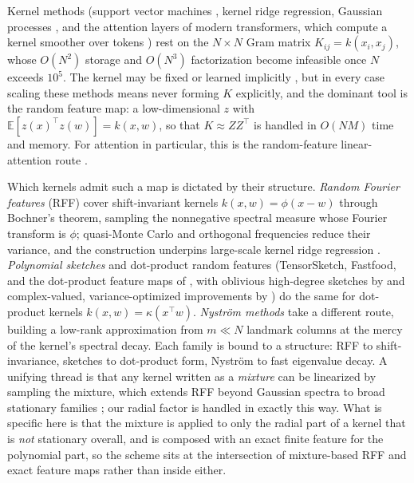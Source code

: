 \documentclass{article}
\begin{document}
Kernel methods (support vector machines \citep{cortes1995support}, kernel ridge regression, Gaussian processes \citep{rasmussen2006gaussian}, and the attention layers of modern transformers, which compute a kernel smoother over tokens \citep{tsai2019transformer}) rest on the $N\times N$ Gram matrix $K_{ij}=k(x_i,x_j)$, whose $O(N^2)$ storage and $O(N^3)$ factorization become infeasible once $N$ exceeds $10^5$. The kernel may be fixed or learned implicitly \citep{li2019implicit}, but in every case scaling these methods means never forming $K$ explicitly, and the dominant tool is the random feature map: a low-dimensional $z$ with $\mathbb{E}[z(x)^\top z(w)]=k(x,w)$, so that $K\approx ZZ^\top$ is handled in $O(NM)$ time and memory. For attention in particular, this is the random-feature linear-attention route \citep{katharopoulos2020transformers,choromanski2021rethinking}.

Which kernels admit such a map is dictated by their structure. \emph{Random Fourier features} (RFF) \citep{rahimi2007random} cover shift-invariant kernels $k(x,w)=\phi(x-w)$ through Bochner's theorem, sampling the nonnegative spectral measure whose Fourier transform is $\phi$; quasi-Monte Carlo \citep{avron2016quasi} and orthogonal frequencies \citep{yu2016orthogonal} reduce their variance, and the construction underpins large-scale kernel ridge regression \citep{avron2017random}. \emph{Polynomial sketches} and dot-product random features (TensorSketch, Fastfood, and the dot-product feature maps of \citealp{pham2013fast,le2013fastfood,kar2012random}, with oblivious high-degree sketches by \citealp{ahle2020oblivious} and complex-valued, variance-optimized improvements by \citealp{wacker2024improved}) do the same for dot-product kernels $k(x,w)=\kappa(x^\top w)$. \emph{Nystr\"om methods} \citep{williams2000using,musco2017recursive} take a different route, building a low-rank approximation from $m\ll N$ landmark columns at the mercy of the kernel's spectral decay. Each family is bound to a structure: RFF to shift-invariance, sketches to dot-product form, Nystr\"om to fast eigenvalue decay. A unifying thread is that any kernel written as a \emph{mixture} can be linearized by sampling the mixture, which extends RFF beyond Gaussian spectra to broad stationary families \citep{wilson2013gpkernels}; our radial factor is handled in exactly this way. What is specific here is that the mixture is applied to only the radial part of a kernel that is \emph{not} stationary overall, and is composed with an exact finite feature for the polynomial part, so the scheme sits at the intersection of mixture-based RFF and exact feature maps rather than inside either.
\end{document}
